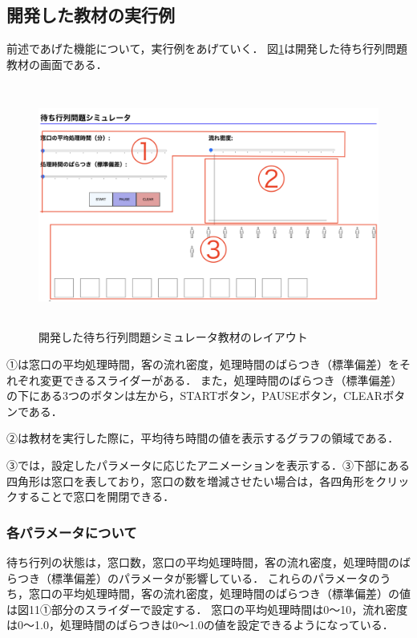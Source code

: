 \documentclass[12pt,a4j]{ltjsarticle}
\begin{document}
\subsection{開発した教材の実行例}
前述であげた機能について，実行例をあげていく．
図\ref{fig:layout_ex}は開発した待ち行列問題教材の画面である．
\begin{figure}[h]
\begin{center}
\includegraphics[height = 80mm ] {figures/layout_ex.pdf}
\caption{開発した待ち行列問題シミュレータ教材のレイアウト}
\end{center}
\label{fig:layout_ex}
\end{figure}

①は窓口の平均処理時間，客の流れ密度，処理時間のばらつき（標準偏差）をそれぞれ変更できるスライダーがある．
また，処理時間のばらつき（標準偏差）の下にある3つのボタンは左から，STARTボタン，PAUSEボタン，CLEARボタンである．

②は教材を実行した際に，平均待ち時間の値を表示するグラフの領域である．

③では，設定したパラメータに応じたアニメーションを表示する．③下部にある四角形は窓口を表しており，窓口の数を増減させたい場合は，各四角形をクリックすることで窓口を開閉できる．

\clearpage

\subsubsection{各パラメータについて}
待ち行列の状態は，窓口数，窓口の平均処理時間，客の流れ密度，処理時間のばらつき（標準偏差）のパラメータが影響している．
これらのパラメータのうち，窓口の平均処理時間，客の流れ密度，処理時間のばらつき（標準偏差）の値は図11①部分のスライダーで設定する．
窓口の平均処理時間は0〜10，流れ密度は0〜1.0，処理時間のばらつきは0〜1.0の値を設定できるようになっている．
\end{document}
